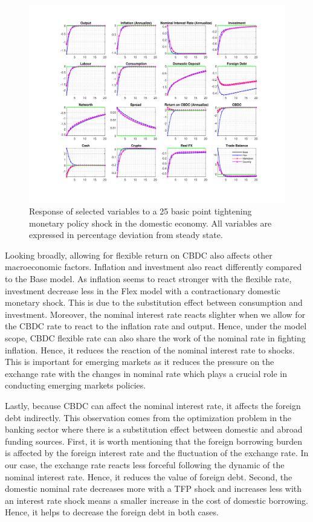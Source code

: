 \documentclass[12pt, a4paper]{article}
\begin{document}
\begin{figure}[H]
  \hspace{-0.7cm}
	\centering
	\centerline{\includegraphics[trim = 0mm 23mm 0mm 18mm, clip, scale=0.97]{monetary_alt.pdf}}
	\caption{Response of selected variables to a 25 basic point tightening monetary policy shock in the domestic economy. All variables are expressed in percentage deviation from steady state.}
	\label{monalt}
\end{figure}

Looking broadly, allowing for flexible return on CBDC also affects other macroeconomic factors. Inflation and investment also react differently compared to the Base model. As inflation seems to react stronger with the flexible rate, investment decrease less in the Flex model with a contractionary domestic monetary shock. This is due to the substitution effect between consumption and investment. Moreover, the nominal interest rate reacts slighter when we allow for the CBDC rate to react to the inflation rate and output. Hence, under the model scope, CBDC flexible rate can also share the work of the nominal rate in fighting inflation. Hence, it reduces the reaction of the nominal interest rate to shocks. This is important for emerging markets as it reduces the pressure on the exchange rate with the changes in nominal rate which plays a crucial role in conducting emerging markets policies. 

Lastly, because CBDC can affect the nominal interest rate, it affects the foreign debt indirectly. This observation comes from the optimization problem in the banking sector where there is a substitution effect between domestic and abroad funding sources. First, it is worth mentioning that the foreign borrowing burden is affected by the foreign interest rate and the fluctuation of the exchange rate. In our case, the exchange rate reacts less forceful following the dynamic of the nominal interest rate. Hence, it reduces the value of foreign debt. Second, the domestic nominal rate decreases more with a TFP shock and increases less with an interest rate shock means a smaller increase in the cost of domestic borrowing. Hence, it helps to decrease the foreign debt in both cases.
\end{document}
